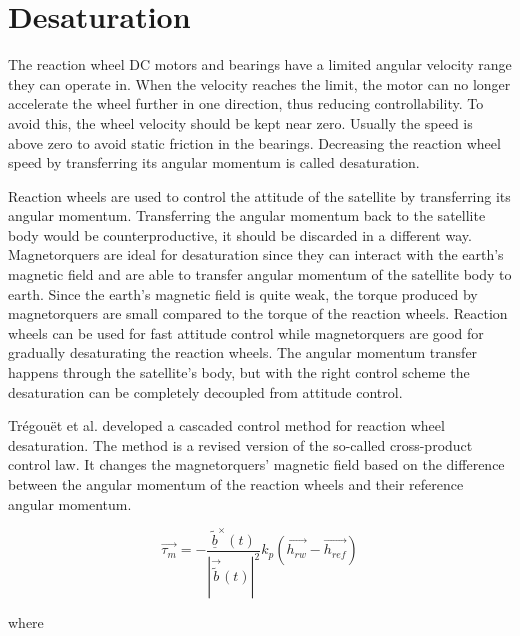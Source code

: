 \section{Desaturation}

The reaction wheel DC motors and bearings have a limited angular velocity range they can operate in. When the velocity reaches the limit, the motor can no longer accelerate the wheel further in one direction, thus reducing controllability. To avoid this, the wheel velocity should be kept near zero. Usually the speed is above zero to avoid static friction in the bearings. Decreasing the reaction wheel speed by transferring its angular momentum is called desaturation.

Reaction wheels are used to control the attitude of the satellite by transferring its angular momentum. Transferring the angular momentum back to the satellite body would be counterproductive, it should be discarded in a different way. Magnetorquers are ideal for desaturation since they can interact with the earth's magnetic field and are able to transfer angular momentum of the satellite body to earth. Since the earth's magnetic field is quite weak, the torque produced by magnetorquers are small compared to the torque of the reaction wheels. Reaction wheels can be used for fast attitude control while magnetorquers are good for gradually desaturating the reaction wheels. The angular momentum transfer happens through the satellite's body, but with the right control scheme the desaturation can be  completely decoupled from attitude control.

Trégouët et al. \cite{DesatTregouet} developed a cascaded control method for reaction wheel desaturation. The method is a revised version of the so-called cross-product control law. It changes the magnetorquers' magnetic field based on the difference between the angular momentum of the reaction wheels and their reference angular momentum.

\begin{equation}
\vec{\tau_m} = -\frac{\underline{\tilde{b}}^\times(t)}{|\vec{\tilde{b}}(t) |^2} k_p\left(\vec{h_{rw}} - \vec{h_{ref}} \right)
\end{equation}

where  

